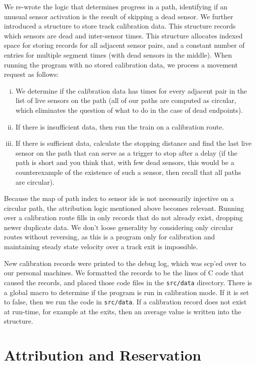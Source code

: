 \documentclass{amsart} \usepackage{amsmath} \usepackage{upgreek}
\begin{document}
We re-wrote the logic that determines progress in a path, identifying if an unusual sensor activation is the result of skipping a dead sensor. We further introduced a structure to store track calibration data. This structure records which sensors are dead and inter-sensor times. This structure allocates indexed space for storing records for all adjacent sensor pairs, and a constant number of entries for multiple segment times (with dead sensors in the middle). When running the program with no stored calibration data, we process a movement request as follows:
\begin{enumerate}[i.]
    \item We determine if the calibration data has times for every adjacent pair in the list of live sensors on the path (all of our paths are computed as circular, which eliminates the question of what to do in the case of dead endpoints).
    \item If there is insufficient data, then run the train on a calibration route.
    \item If there is sufficient data, calculate the stopping distance and find the last live sensor on the path that can serve as a trigger to stop after a delay (if the path is short and you think that, with few dead sensors, this would be a counterexample of the existence of such a sensor, then recall that all paths are circular).
\end{enumerate}
Because the map of path index to sensor ids is not necessarily injective on a circular path, the attribution logic mentioned above becomes relevant. Running over a calibration route fills in only records that do not already exist, dropping newer duplicate data. We don't loose generality by considering only circular routes without reversing, as this is a program only for calibration and maintaining steady state velocity over a track exit is impossible.

New calibration records were printed to the debug log, which was scp'ed over to our personal machines. We formatted the records to be the lines of C code that caused the records, and placed those code files in the \texttt{src/data} directory. There is a global macro to determine if the program is run in calibration mode. If it is set to false, then we run the code in \texttt{src/data}. If a calibration record does not exist at run-time, for example at the exits, then an average value is written into the structure.

\section*{Attribution and Reservation}
\end{document}
